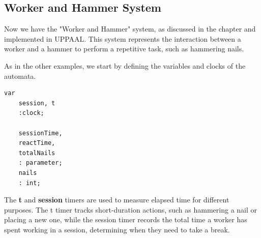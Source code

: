 \begin{table}[h!]
\centering
{}
\caption{Synthesis of properties and corresponding results.}
\label{tab:property_results}
\end{table}


\subsection{Worker and Hammer System}

Now we have the "Worker and Hammer" system, as discussed in the chapter and implemented in UPPAAL. This system represents the interaction between a worker and a hammer to perform a repetitive task, such as hammering nails.

As in the other examples, we start by defining the variables and clocks of the automata.

\begin{lstlisting}[language=UPPAAL]
    var
    session, t
    :clock;
    
    sessionTime,
    reactTime,
    totalNails
    : parameter;
    nails
    : int;	
\end{lstlisting}


The \textbf{t} and \textbf{session} timers are used to measure elapsed time for different purposes. The t timer tracks short-duration actions, such as hammering a nail or placing a new one, while the session timer records the total time a worker has spent working in a session, determining when they need to take a break.

